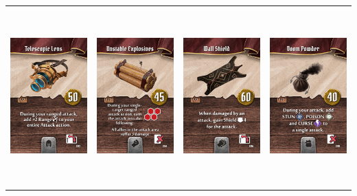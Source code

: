 \documentclass{minimal}
\begin{document}
{\begin{longtable}{llll}
\includegraphics[width=44mm,height=68mm]{./57-63/gh-059-telescopic-lens.png} &
\includegraphics[width=44mm,height=68mm]{./57-63/gh-060-unstable-explosives.png} &
\includegraphics[width=44mm,height=68mm]{./57-63/gh-061-wall-shield.png} &
\includegraphics[width=44mm,height=68mm]{./57-63/gh-062-doom-powder.png}\\ 

\end{longtable}}
\end{document}
